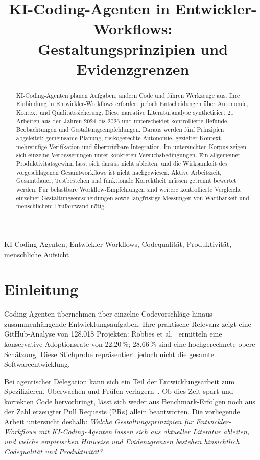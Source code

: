 \documentclass[conference]{IEEEtran}
\title{KI-Coding-Agenten in Entwickler-Workflows:\\Gestaltungsprinzipien und Evidenzgrenzen}
\begin{document}
\maketitle
\begin{abstract}
KI-Coding-Agenten planen Aufgaben, ändern Code und führen Werkzeuge aus. Ihre Einbindung in Entwickler-Workflows erfordert jedoch Entscheidungen über Autonomie, Kontext und Qualitätssicherung. Diese narrative Literaturanalyse synthetisiert 21 Arbeiten aus den Jahren 2024 bis 2026 und unterscheidet kontrollierte Befunde, Beobachtungen und Gestaltungsempfehlungen. Daraus werden fünf Prinzipien abgeleitet: gemeinsame Planung, risikogerechte Autonomie, gezielter Kontext, mehrstufige Verifikation und überprüfbare Integration. Im untersuchten Korpus zeigen sich einzelne Verbesserungen unter konkreten Versuchsbedingungen. Ein allgemeiner Produktivitätsgewinn lässt sich daraus nicht ableiten, und die Wirksamkeit des vorgeschlagenen Gesamtworkflows ist nicht nachgewiesen. Aktive Arbeitszeit, Gesamtdauer, Testbestehen und funktionale Korrektheit müssen getrennt bewertet werden. Für belastbare Workflow-Empfehlungen sind weitere kontrollierte Vergleiche einzelner Gestaltungsentscheidungen sowie langfristige Messungen von Wartbarkeit und menschlichem Prüfaufwand nötig.
\end{abstract}
\begin{IEEEkeywords}
KI-Coding-Agenten, Entwickler-Workflows, Codequalität, Produktivität, menschliche Aufsicht
\end{IEEEkeywords}

\section{Einleitung}
Coding-Agenten übernehmen über einzelne Codevorschläge hinaus zusammenhängende Entwicklungsaufgaben. Ihre praktische Relevanz zeigt eine GitHub-Analyse von 128.018 Projekten: Robbes et al.~\cite{robbes2026agenticmuch} ermitteln eine konservative Adoptionsrate von 22,20\,\%; 28,66\,\% sind eine hochgerechnete obere Schätzung. Diese Stichprobe repräsentiert jedoch nicht die gesamte Softwareentwicklung.

Bei agentischer Delegation kann sich ein Teil der Entwicklungsarbeit zum Spezifizieren, Überwachen und Prüfen verlagern~\cite{dhanorkar2026oversight}. Ob dies Zeit spart und korrekten Code hervorbringt, lässt sich weder aus Benchmark-Erfolgen noch aus der Zahl erzeugter Pull Requests (PRs) allein beantworten. Die vorliegende Arbeit untersucht deshalb:
\emph{Welche Gestaltungsprinzipien für Entwickler-Workflows mit KI-Coding-Agenten lassen sich aus aktueller Literatur ableiten, und welche empirischen Hinweise und Evidenzgrenzen bestehen hinsichtlich Codequalität und Produktivität?}
\end{document}
